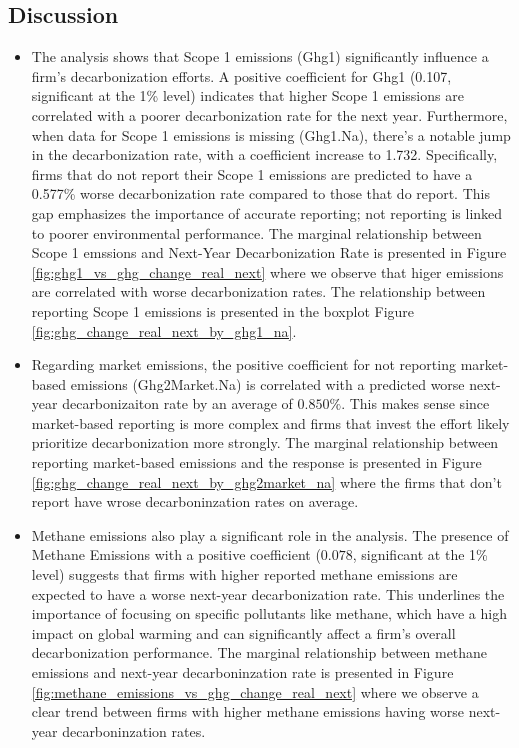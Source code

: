 \subsection{Discussion}

\begin{itemize}
    \item The analysis shows that Scope 1 emissions (Ghg1) significantly influence a firm's decarbonization efforts. A positive coefficient for Ghg1 (0.107, significant at the 1\% level) indicates that higher Scope 1 emissions are correlated with a poorer decarbonization rate for the next year. Furthermore, when data for Scope 1 emissions is missing (Ghg1.Na), there's a notable jump in the decarbonization rate, with a coefficient increase to 1.732. Specifically, firms that do not report their Scope 1 emissions are predicted to have a 0.577\% worse decarbonization rate compared to those that do report. This gap emphasizes the importance of accurate reporting; not reporting is linked to poorer environmental performance. The marginal relationship between Scope 1 emssions and Next-Year Decarbonization Rate is presented in Figure \ref{fig:ghg1_vs_ghg_change_real_next} where we observe that higer emissions are correlated with worse decarbonization rates. The relationship between reporting Scope 1 emissions is presented in the boxplot Figure \ref{fig:ghg_change_real_next_by_ghg1_na}.

    \item Regarding market emissions, the positive coefficient for not reporting market-based emissions (Ghg2Market.Na) is correlated with a predicted worse next-year decarbonizaiton rate by an average of $0.850 \%$. This makes sense since market-based reporting is more complex and firms that invest the effort likely prioritize decarbonization more strongly. The marginal relationship between reporting market-based emissions and the response is presented in Figure \ref{fig:ghg_change_real_next_by_ghg2market_na} where the firms that don't report have wrose decarboninzation rates on average.
    
    \item Methane emissions also play a significant role in the analysis. The presence of Methane Emissions with a positive coefficient ($0.078$, significant at the 1\% level) suggests that firms with higher reported methane emissions are expected to have a worse next-year decarbonization rate. This underlines the importance of focusing on specific pollutants like methane, which have a high impact on global warming and can significantly affect a firm's overall decarbonization performance. The marginal relationship between methane emissions and next-year decarboninzation rate is presented in Figure \ref{fig:methane_emissions_vs_ghg_change_real_next} where we observe a clear trend between firms with higher methane emissions having worse next-year decarboninzation rates.
    


\end{itemize}
